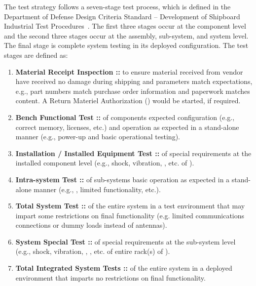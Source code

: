 
The test strategy follows a seven-stage test process, which is defined in the Department of Defense Design Criteria Standard -- Development of Shipboard Industrial Test Procedures~\cite{ref__DOD_STD_2106_NAVY}.
The first three stages occur at the component level and the second three stages occur at the assembly, sub-system, and system level.
The final stage is complete system testing in its deployed configuration.
The test stages are defined as:
\begin{enumerate}
	\item {\bf Material Receipt Inspection :: } to ensure material received from vendor have received no damage during shipping and parameters match expectations, e.g., part numbers match purchase order information and paperwork matches content.  A Return Materiel Authorization (\RMA) would be started, if required.
	\item {\bf Bench Functional Test :: } of components expected configuration (e.g., correct memory, licenses, etc.) and operation as expected in a stand-alone manner (e.g., power-up and basic operational testing).
	\item {\bf Installation / Installed Equipment Test :: } of special requirements at the installed component level (e.g., shock, vibration, \EMI, etc. of \LRUs).
	\item {\bf Intra-system Test  :: } of sub-systems basic operation as expected in a stand-alone manner (e.g., \SWaP, limited functionality, etc.).
	\item {\bf Total System Test :: } of the entire system in a test environment that may impart some restrictions on final functionality (e.g. limited communications connections or dummy loads instead of antennas).
	\item {\bf System Special Test :: } of special requirements at the sub-system level (e.g., shock, vibration, \EMI, \EMC, etc. of entire rack(s) of \LRUs).
	\item {\bf Total Integrated System Tests :: } of the entire system in a deployed environment that imparts no restrictions on final functionality.
\end{enumerate}